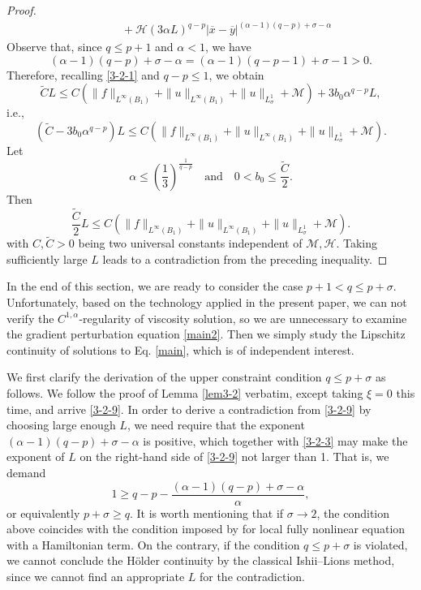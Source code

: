 \documentclass[11pt,reqno]{amsart}
\numberwithin{equation}{section}
\begin{document}
\begin{proof}
\begin{equation}
\begin{split}
&\qquad+\mathcal{H}(3\alpha L)^{q-p}|\overline{x}-\overline{y}|^{(\alpha-1)(q-p)+\sigma-\alpha}
\end{split}
\end{equation}
Observe that, since $q\le p+1$ and $\alpha<1$, we have
$$
(\alpha-1)(q-p)+\sigma-\alpha=(\alpha-1)(q-p-1)+\sigma-1>0.
$$
Therefore, recalling \eqref{3-2-1} and $q-p\le1$, we obtain
$$
\widetilde{C}L\le C(\|f\|_{L^\infty(B_1)}+\|u\|_{L^\infty(B_1)}+\|u\|_{L^1_\sigma}+\mathcal{M})+3b_0\alpha ^{q-p}L,
$$
i.e.,
$$
(\widetilde{C}-3b_0\alpha ^{q-p})L\le C(\|f\|_{L^\infty(B_1)}+\|u\|_{L^\infty(B_1)}+\|u\|_{L^1_\sigma}+\mathcal{M}).
$$
Let
$$
\alpha\le\left(\frac{1}{3}\right)^\frac{1}{q-p} \quad\text{and}\quad  0<b_0\le\frac{\widetilde{C}}{2}.
$$
Then
$$
\frac{\widetilde{C}}{2}L\le C(\|f\|_{L^\infty(B_1)}+\|u\|_{L^\infty(B_1)}+\|u\|_{L^1_\sigma}+\mathcal{M}).
$$
with $C,\widetilde{C}>0$ being two universal constants independent of $\mathcal{M},\mathcal{H}$. Taking sufficiently large $L$ leads to a contradiction from the preceding inequality.
\end{proof}



In the end of this section, we are ready to consider the case $p+1<q\le p+\sigma$. Unfortunately, based on the technology applied in the present paper, we can not verify the $C^{1,\alpha}$-regularity of viscosity solution, so we are unnecessary to examine the gradient perturbation equation \eqref{main2}. Then we simply study the Lipschitz continuity of solutions to Eq. \eqref{main}, which is of independent interest.

\smallskip

We first clarify the derivation of the upper constraint condition $q\le p+\sigma$ as follows. We follow the proof of Lemma \ref{lem3-2} verbatim, except taking $\xi=0$ this time, and arrive \eqref{3-2-9}. In order to derive a contradiction from \eqref{3-2-9} by choosing large enough $L$, we need require that the exponent $(\alpha-1)(q-p)+\sigma-\alpha$ is positive, which together with \eqref{3-2-3} may make the exponent of $L$ on the right-hand side of \eqref{3-2-9} not larger than 1. That is, we demand
$$
1\ge q-p-\frac{(\alpha-1)(q-p)+\sigma-\alpha}{\alpha},
$$
or equivalently $p+\sigma\ge q$.
It is worth mentioning that if $\sigma\rightarrow2$, the condition above coincides with the condition imposed by \cite{BDL19,BD16} for local fully nonlinear equation with a Hamiltonian term.
On the contrary, if the condition $q\le p+\sigma$ is violated, we cannot conclude the H\"{o}lder continuity by the classical Ishii--Lions method, since we cannot find an appropriate $L$ for the contradiction.
\end{document}
